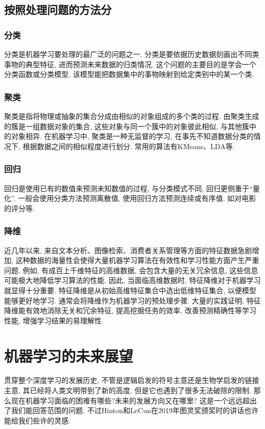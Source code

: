 \documentclass[lang=cn,11pt,a4paper]{elegantpaper}
\begin{document}
\subsection{按照处理问题的方法分}
\subsubsection*{分类}
分类是机器学习要处理的最广泛的问题之一. 分类是要依据历史数据刻画出不同类事物的典型特征, 进而预测未来数据的归类情况. 这个问题的主要目的是学会一个分类函数或分类模型, 该模型能把数据集中的事物映射到给定类别中的某一个类. 
\subsubsection*{聚类}
聚类是指将物理或抽象的集合分成由相似的对象组成的多个类的过程. 由聚类生成的簇是一组数据对象的集合, 这些对象与同一个簇中的对象彼此相似, 与其他簇中的对象相异. 在机器学习中, 聚类是一种无监督的学习, 在事先不知道数据分类的情况下, 根据数据之间的相似程度进行划分. 常用的算法有KMeans、LDA等. 
\subsubsection*{回归}
回归是使用已有的数值来预测未知数值的过程, 与分类模式不同, 回归更侧重于“量化”. 一般会使用分类方法预测离散值, 使用回归方法预测连续或有序值. 如对电影的评分等. 
\subsubsection*{降维}
近几年以来, 来自文本分析、图像检索、消费者关系管理等方面的特征数据急剧增加, 这种数据的海量性会使得大量机器学习算法在有效性和学习性能方面产生严重问题. 例如, 有成百上千维特征的高维数据, 会包含大量的无关冗余信息, 这些信息可能极大地降低学习算法的性能. 因此, 当面临高维数据时, 特征降维对于机器学习就显得十分重要. 特征降维是从初始高维特征集合中选出低维特征集合, 以便模型能够更好地学习. 通常会将降维作为机器学习的预处理步骤. 大量的实践证明, 特征降维能有效地消除无关和冗余特征, 提高挖掘任务的效率, 改善预测精确性等学习性能, 增强学习结果的易理解性. 

\section{机器学习的未来展望}

贯穿整个深度学习的发展历史, 不管是逻辑启发的符号主意还是生物学启发的链接主意, 其已经将人类文明带到了新的高度. 但是它也遇到了很多无法破除的限制. 那么现在机器学习面临的困难有哪些?未来的发展方向又在哪里? 这是一个远远超出了我们能回答范围的问题, 不过Hinton和LeCun在2019年图灵奖颁奖时的讲话也许能给我们些许的灵感.
\end{document}
